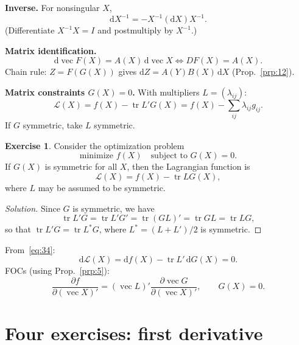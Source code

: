 \documentclass[14pt]{extarticle}
\theoremstyle{plain}
\theoremstyle{definition}
\newtheorem{exercise}{Exercise}
\theoremstyle{remark}
\newenvironment{solution}{%
  \begin{proof}[Solution]%
}{%
  \end{proof}%
}
\DeclareMathOperator{\tr}{tr}
\DeclareMathOperator{\avec}{vec}
\newcommand{\dd}{\mathrm{d}}
\begin{document}
\textbf{Inverse.} For nonsingular $X$,
\begin{equation}\label{eq:32}
\dd X^{-1} = -X^{-1}(\dd X)X^{-1}.
\end{equation}
(Differentiate $X^{-1}X = I$ and postmultiply by $X^{-1}$.)

\textbf{Matrix identification.}
\begin{equation}\label{eq:33}
\dd\avec F(X) = A(X)\, \dd\avec X \iff DF(X) = A(X).
\end{equation}
Chain rule: $Z = F(G(X))$ gives $\dd Z = A(Y) B(X)\,\dd X$ (Prop.~\ref{prp:12}).

\textbf{Matrix constraints $G(X) = 0$.} With multipliers $L = (\lambda_{ij})$:
\begin{equation}\label{eq:34}
\mathcal{L}(X) = f(X) - \tr L'G(X) = f(X) - \sum_{ij} \lambda_{ij} g_{ij}.
\end{equation}
If $G$ symmetric, take $L$ symmetric.

\begin{exercise}\label{exer:18}
Consider the optimization problem
\[
\text{minimize } f(X) \quad \text{subject to } G(X) = 0.
\]
If $G(X)$ is symmetric for all $X$, then the Lagrangian function is
\[
\mathcal{L}(X) = f(X) - \tr LG(X),
\]
where $L$ may be assumed to be symmetric.
\end{exercise}

\begin{solution}
Since $G$ is symmetric, we have
\[
\tr L'G = \tr L'G' = \tr(GL)' = \tr GL = \tr LG,
\]
so that $\tr L'G = \tr L^* G$, where $L^* = (L + L')/2$ is symmetric.
\end{solution}

From~\eqref{eq:34}:
\begin{equation}\label{eq:35}
\dd\mathcal{L}(X) = \dd f(X) - \tr L'\, \dd G(X) = 0.
\end{equation}
FOCs (using Prop.~\ref{prp:5}):
\begin{equation}\label{eq:36}
\frac{\partial f}{\partial(\avec X)'} = (\avec L)' \frac{\partial \avec G}{\partial(\avec X)'}, \qquad G(X) = 0.
\end{equation}

\section{Four exercises: first derivative}\label{sec:8}
\end{document}
